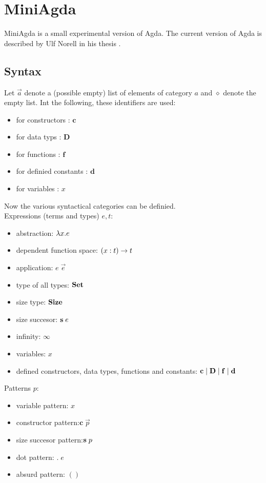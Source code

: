 \chapter{MiniAgda}

\newcommand{\dd}{\mathbf{d}}
\newcommand{\DD}{\mathbf{D}}
\newcommand{\cc}{\mathbf{c}}
\newcommand{\ff}{\mathbf{f}}

MiniAgda is a small experimental version of Agda.
The current version of Agda is described by Ulf Norell in his thesis \cite{norell:thesis}.
\section{Syntax}
Let $\vec{a}$ denote a (possible empty) list of elements of category $a$
and $\diamond$ denote the empty list.
Int the following, these identifiers are used:
\begin{itemize}
\item for constructors : $\cc$ 
\item for data typs : $\DD$
\item for functions : $\ff$
\item for definied constants : $\dd$
\item for variables : $x$
\end{itemize}
Now the various syntactical categories can be definied.
\\
Expressions (terms and types) $e,t$:  
\begin{itemize}
\item
abstraction: $ \lambda x . e $ 
\item
dependent function space: $( x : t ) \rightarrow t$ 
\item 
application: $ e \; \vec{e} $ 
\item
type of all types: $ \mathbf{Set} $ 
\item
size type: $ \mathbf{Size} $ 
\item
size succesor: $\mathbf{s}\; e $ 
\item
infinity: $\infty$ 
\item
variables: $x$
\item
defined constructors, data types, functions and constants:
$ \cc \vsp \DD \vsp \ff \vsp \dd$
\end{itemize}
Patterns $p$:
\begin{itemize}
\item
variable pattern: $x$ 
\item
constructor pattern:$ \cc \; \vec{p} $ 
\item
size succesor pattern:$ \mathbf{s}\; p $ 
\item
dot pattern: $ . \; e $ 
\item
absurd pattern: $()$
\end{itemize}

